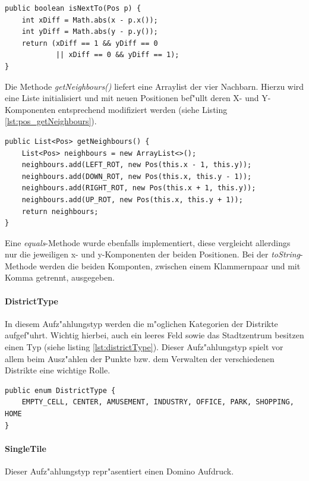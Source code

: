 \begin{lstlisting}[float,style=CodeHighlighting,caption=Pos - isNextTo(),label=lst:pos_isNextTo]
public boolean isNextTo(Pos p) {
    int xDiff = Math.abs(x - p.x());
	int yDiff = Math.abs(y - p.y());
	return (xDiff == 1 && yDiff == 0
            || xDiff == 0 && yDiff == 1);
}
\end{lstlisting}

Die Methode \emph{getNeighbours()} liefert eine Arraylist der vier Nachbarn. Hierzu wird eine Liste initialisiert und mit neuen Positionen bef"ullt deren X- und Y-Komponenten entsprechend modifiziert werden (siehe Listing \ref{lst:pos_getNeighbours}). 

\begin{lstlisting}[float,style=CodeHighlighting,caption=Pos - getNeighbours(),label=lst:pos_getNeighbours]
public List<Pos> getNeighbours() {
    List<Pos> neighbours = new ArrayList<>();
    neighbours.add(LEFT_ROT, new Pos(this.x - 1, this.y));
    neighbours.add(DOWN_ROT, new Pos(this.x, this.y - 1));
    neighbours.add(RIGHT_ROT, new Pos(this.x + 1, this.y));
    neighbours.add(UP_ROT, new Pos(this.x, this.y + 1));
    return neighbours;
}
\end{lstlisting}

Eine \emph{equals}-Methode wurde ebenfalls implementiert, diese vergleicht allerdings nur die jeweiligen x- und y-Komponenten der beiden Positionen. Bei der \emph{toString}-Methode werden die beiden Komponten, zwischen einem Klammernpaar und mit Komma getrennt, ausgegeben. 

\paragraph{DistrictType}
\label{par:districtType}
In diesem Aufz"ahlungstyp werden die m"oglichen Kategorien der Distrikte aufgef"uhrt. Wichtig hierbei, auch ein leeres Feld sowie das Stadtzentrum besitzen einen Typ (siehe listing \ref{lst:districtType}). 
Dieser Aufz"ahlungstyp spielt vor allem beim Ausz"ahlen der Punkte bzw. dem Verwalten der verschiedenen Distrikte eine wichtige Rolle. 
\begin{lstlisting}[float,style=CodeHighlighting,caption=DistrictType,label=lst:districtType]
public enum DistrictType {
    EMPTY_CELL, CENTER, AMUSEMENT, INDUSTRY, OFFICE, PARK, SHOPPING, HOME
}
\end{lstlisting}

\paragraph{SingleTile}
\label{par:singleTile}
Dieser Aufz"ahlungstyp repr"asentiert einen Domino Aufdruck. 

